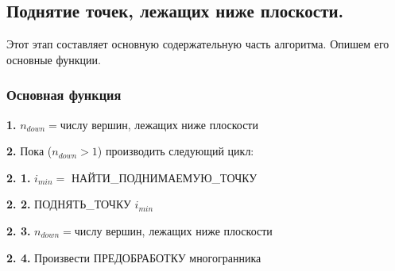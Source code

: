 \documentclass[a4paper,12pt, titlepage]{article}
\begin{document}


\subsection{Поднятие точек, лежащих ниже плоскости.}
\begin{flushleft}
 Этот этап составляет основную содержательную часть алгоритма. Опишем его основные функции.
\end{flushleft}

\subsubsection{Основная функция}
\begin{flushleft}
 \textbf{1.} $n_{down} = $числу вершин, лежащих ниже плоскости
\end{flushleft} 
\begin{flushleft}
 \textbf{2.} Пока ($n_{down} > 1$) производить следующий цикл:
\end{flushleft} 
\begin{flushleft}
 \textbf{2. 1.} $i_{min} = $ НАЙТИ\_ПОДНИМАЕМУЮ\_ТОЧКУ
\end{flushleft} 
\begin{flushleft}
 \textbf{2. 2.} ПОДНЯТЬ\_ТОЧКУ $i_{min}$
\end{flushleft} 
\begin{flushleft}
 \textbf{2. 3.} $n_{down} = $числу вершин, лежащих ниже плоскости
\end{flushleft} 
\begin{flushleft}
 \textbf{2. 4.} Произвести ПРЕДОБРАБОТКУ многогранника
\end{flushleft} 
\end{document}
